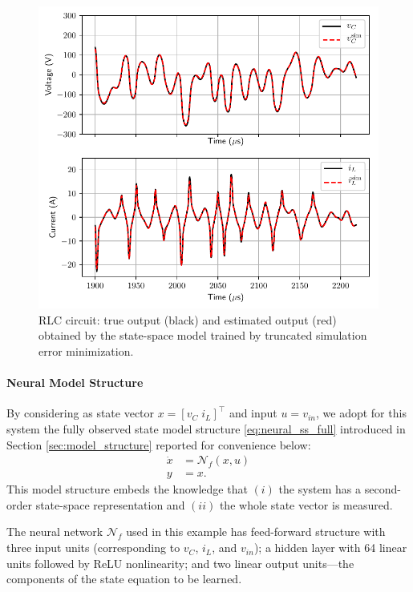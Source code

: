 \documentclass{article} %
\newcommand{\NN}{\mathcal{N}} %
\begin{document}
\begin{figure}[!t]
\centering
   \includegraphics[width=.75\linewidth]{fig/RLC/RLC_SS_val_64step_noise.pdf}
\caption{RLC circuit: true output (black) and  estimated output (red) obtained by the state-space model trained by truncated simulation error minimization.}
\label{fig:RLC_SS_val_64step_noise}
\end{figure}
\paragraph{Neural Model Structure}
By considering as state vector $x = [v_C\; i_L]^\top$ and input $u=v_{in}$, we adopt for this system the fully observed state model structure \eqref{eq:neural_ss_full} introduced in 
Section \ref{sec:model_structure} reported for convenience below: %
\begin{align*}
\dot x
 & = \NN_{\!f}(x, u) \\
 y &=  
 x.
\end{align*}
This model structure embeds the knowledge that $(i)$ the system has a second-order state-space representation and $(ii)$ the whole state vector is measured. 

The neural network $\NN_{\!f}$ used in this example has feed-forward structure with three input units (corresponding to $v_C$, $i_L$, and $v_{in}$); a hidden layer with 64 linear units followed by ReLU nonlinearity; and two linear output units---the components of the state equation to be learned. 
\end{document}
